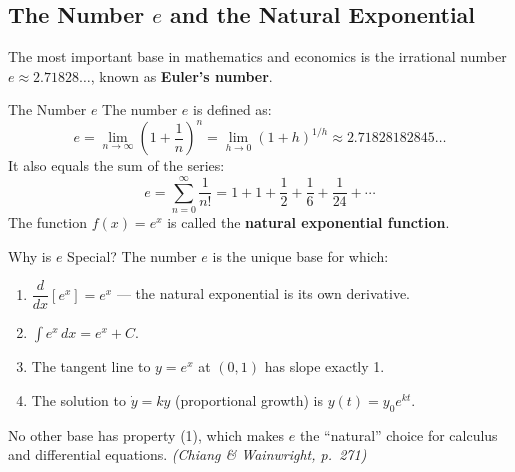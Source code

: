 \documentclass[12pt, a4paper]{article}
\theoremstyle{definition}
\newcommand{\dd}[1]{\,d#1}
\begin{document}
\subsection{The Number $e$ and the Natural Exponential}

The most important base in mathematics and economics is the irrational number $e \approx 2.71828\ldots$, known as \textbf{Euler's number}.

\begin{defbox}{The Number $e$}
The number $e$ is defined as:
\[
  e = \lim_{n \to \infty}\left(1 + \frac{1}{n}\right)^n
    = \lim_{h \to 0}(1 + h)^{1/h}
    \approx 2.71828182845\ldots
\]
It also equals the sum of the series:
\[
  e = \sum_{n=0}^{\infty} \frac{1}{n!}
    = 1 + 1 + \frac{1}{2} + \frac{1}{6} + \frac{1}{24} + \cdots
\]
The function $f(x) = e^x$ is called the \textbf{natural exponential function}.
\end{defbox}

\begin{keybox}{Why is $e$ Special?}
The number $e$ is the unique base for which:
\begin{enumerate}
  \item $\dfrac{d}{dx}[e^x] = e^x$ --- the natural exponential is its own derivative.
  \item $\displaystyle\int e^x \dd{x} = e^x + C$.
  \item The tangent line to $y = e^x$ at $(0,1)$ has slope exactly 1.
  \item The solution to $\dot y = ky$ (proportional growth) is $y(t) = y_0 e^{kt}$.
\end{enumerate}
No other base has property (1), which makes $e$ the ``natural'' choice for
calculus and differential equations. \emph{(Chiang \& Wainwright, p.\ 271)}
\end{keybox}
\end{document}
